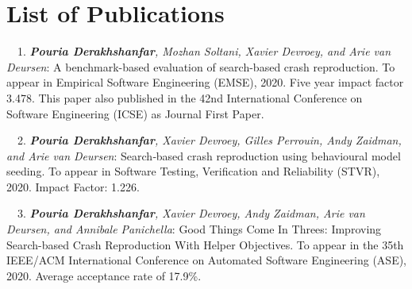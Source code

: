 \chapter*{List of Publications}
\label{publications}



\begin{etaremune}{\small
    \item[\faFileTextO~~1.] \emph{\textbf{Pouria Derakhshanfar}, Mozhan Soltani, Xavier Devroey, and Arie van Deursen}: 
        A benchmark-based evaluation of search-based crash reproduction.
        To appear in Empirical Software Engineering (EMSE),
        2020. Five year impact factor 3.478. This paper also published in the 42nd International Conference on Software Engineering (ICSE) as Journal First Paper.
}\end{etaremune}

\begin{etaremune}{\small
    \item[\faFileTextO~~2.] \emph{\textbf{Pouria Derakhshanfar}, Xavier Devroey, Gilles Perrouin,  Andy Zaidman, and Arie van Deursen}: 
        Search‐based crash reproduction using behavioural model seeding.
        To appear in  Software Testing, Verification and Reliability (STVR),
        2020. Impact Factor: 1.226.
}\end{etaremune}

\begin{etaremune}{\small
    \item[\faFileTextO~~3.] \emph{\textbf{Pouria Derakhshanfar}, Xavier Devroey,  Andy Zaidman, Arie van Deursen, and Annibale Panichella}: 
        Good Things Come In Threes: Improving Search-based Crash Reproduction With Helper Objectives.
        To appear in the 35th IEEE/ACM International Conference on Automated Software Engineering (ASE),
        2020. Average acceptance rate of 17.9\%.
}\end{etaremune}


